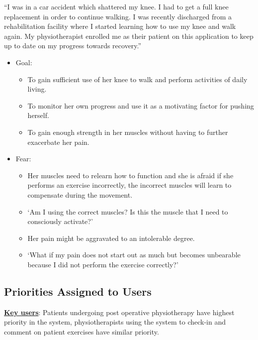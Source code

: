 \documentclass[12pt]{article}
\begin{document}
\noindent “I was in a car accident which shattered my knee. I had to get a full knee replacement in order to continue walking. I was recently discharged from a rehabilitation facility where I started learning how to use my knee and walk again. My physiotherapist enrolled me as their patient on this application to keep up to date on my progress towards recovery.” \\

\begin{itemize}
  \item Goal: 
  \begin{itemize}
    \item To gain sufficient use of her knee to walk and perform activities of daily living.
    \item To monitor her own progress and use it as a motivating factor for pushing herself.
    \item To gain enough strength in her muscles without having to further exacerbate her pain.
  \end{itemize}
 \item Fear:
 \begin{itemize}
   \item Her muscles need to relearn how to function and she is afraid if she performs an exercise incorrectly, the incorrect muscles will learn to compensate during the movement.
   \item ‘Am I using the correct muscles? Is this the muscle that I need to consciously activate?’
   \item Her pain might be aggravated to an intolerable degree.
   \item ‘What if my pain does not start out as much but becomes unbearable because I did not perform the exercise correctly?’
 \end{itemize}
\end{itemize}

\subsection{Priorities Assigned to Users}
\textbf{\underline{Key users}}: Patients undergoing post operative physiotherapy have highest priority in the system, physiotherapists using the system to check-in and comment on patient exercises have similar priority. 
\end{document}
